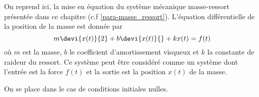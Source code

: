 On reprend ici, la mise en équation du système mécanique masse-ressort 
présentée dans ce chapitre (c.f \cref{para-masse_ressort}). L'équation 
différentielle de la position de la masse est donnée par 
\[
m\devi{x(t)}{2}+b\devi{x(t)}{}+kx(t)=f(t)
\]
où $m$ est la masse, $b$ le coefficient d'amortissement visqueux et $k$ la
constante de raideur du ressort. Ce système peut être considéré comme
un système dont l'entrée est la force $f(t)$ et la sortie est la position
$x(t)$ de la masse.
\begin{marginfigure}
    \centering
    
\end{marginfigure}
On se place dans le cas de conditions initiales nulles. 




